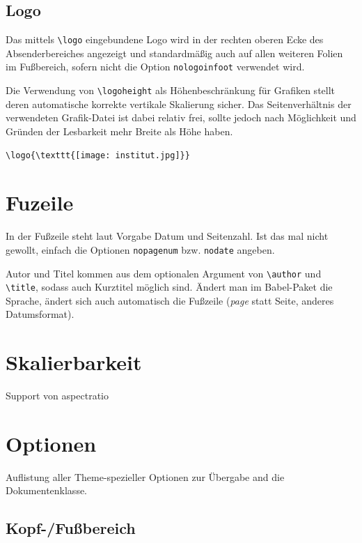 \documentclass[a4paper,colorscheme=green,TUBStitlepage=picture]{tubsreprt}
\begin{document}
\subsection{Logo}

Das mittels \lstinline{\logo} eingebundene Logo wird in der rechten oberen
Ecke des Absenderbereiches angezeigt und standardmäßig auch auf allen weiteren
Folien im Fußbereich, sofern nicht die Option \lstinline{nologoinfoot}
verwendet wird.

Die Verwendung von \lstinline{\logoheight} als Höhenbeschränkung für Grafiken
stellt deren automatische korrekte vertikale Skalierung sicher.
Das Seitenverhältnis der verwendeten Grafik-Datei ist dabei relativ
frei, sollte jedoch nach Möglichkeit und Gründen der Lesbarkeit mehr Breite als
Höhe haben.

\begin{example}
\begin{lstlisting}
\logo{\texttt{[image: institut.jpg]}}
\end{lstlisting}
\end{example}


\section{Fuzeile}

In der Fußzeile steht laut Vorgabe Datum und Seitenzahl.
Ist das mal nicht gewollt, einfach die Optionen \lstinline{nopagenum} bzw.
\lstinline{nodate} angeben.

Autor und Titel kommen aus dem optionalen Argument von \lstinline{\author}
und \lstinline{\title}, sodass auch Kurztitel möglich sind.
Ändert man im Babel-Paket die Sprache, ändert sich auch automatisch
die Fußzeile (\textit{page} statt Seite, anderes Datumsformat).


\section{Skalierbarkeit}

Support von aspectratio


\section{Optionen}

Auflistung aller Theme-spezieller Optionen zur Übergabe and die
Dokumentenklasse.

\subsection{Kopf-/Fußbereich}
\end{document}
